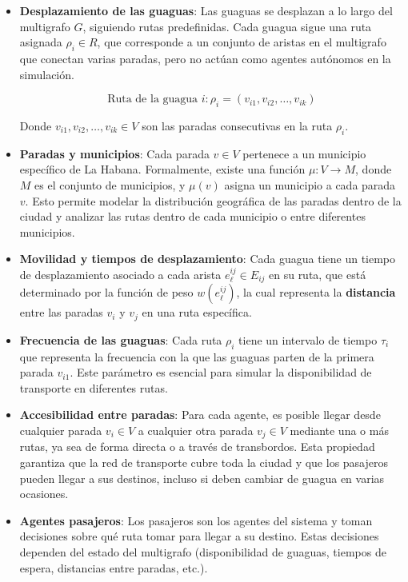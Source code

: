 \documentclass[a4paper,12pt]{article}
\begin{document}
\begin{itemize}
    \item \textbf{Desplazamiento de las guaguas}: Las guaguas se desplazan a lo largo del multigrafo $G$, siguiendo rutas predefinidas. Cada guagua sigue una ruta asignada $\rho_i \in R$, que corresponde a un conjunto de aristas en el multigrafo que conectan varias paradas, pero no actúan como agentes autónomos en la simulación.
    
    \[
    \text{Ruta de la guagua } i: \rho_i = (v_{i1}, v_{i2}, \dots, v_{ik})
    \]
    
    Donde $v_{i1}, v_{i2}, \dots, v_{ik} \in V$ son las paradas consecutivas en la ruta $\rho_i$.
    
    \item \textbf{Paradas y municipios}: Cada parada $v \in V$ pertenece a un municipio específico de La Habana. Formalmente, existe una función $\mu: V \rightarrow M$, donde $M$ es el conjunto de municipios, y $\mu(v)$ asigna un municipio a cada parada $v$. Esto permite modelar la distribución geográfica de las paradas dentro de la ciudad y analizar las rutas dentro de cada municipio o entre diferentes municipios.
    
    \item \textbf{Movilidad y tiempos de desplazamiento}: Cada guagua tiene un tiempo de desplazamiento asociado a cada arista $e_\ell^{ij} \in E_{ij}$ en su ruta, que está determinado por la función de peso $w(e_\ell^{ij})$, la cual representa la \textbf{distancia} entre las paradas $v_i$ y $v_j$ en una ruta específica.
    
    \item \textbf{Frecuencia de las guaguas}: Cada ruta $\rho_i$ tiene un intervalo de tiempo $\tau_i$ que representa la frecuencia con la que las guaguas parten de la primera parada $v_{i1}$. Este parámetro es esencial para simular la disponibilidad de transporte en diferentes rutas.

    \item \textbf{Accesibilidad entre paradas}: Para cada agente, es posible llegar desde cualquier parada $v_i \in V$ a cualquier otra parada $v_j \in V$ mediante una o más rutas, ya sea de forma directa o a través de transbordos. Esta propiedad garantiza que la red de transporte cubre toda la ciudad y que los pasajeros pueden llegar a sus destinos, incluso si deben cambiar de guagua en varias ocasiones.
    
    \item \textbf{Agentes pasajeros}: Los pasajeros son los agentes del sistema y toman decisiones sobre qué ruta tomar para llegar a su destino. Estas decisiones dependen del estado del multigrafo (disponibilidad de guaguas, tiempos de espera, distancias entre paradas, etc.).


\end{itemize}
\end{document}
